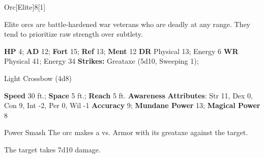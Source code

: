   \begin{monsection}{Orc}[Elite]{8}[1]
    \vspace{-1em}\vspace{-1em}
    \vspace{0em}

    
      Elite orcs are battle-hardened war veterans who are deadly at any range.
      They tend to prioritize raw strength over subtlety.
    

    \begin{spellcontent}
      \begin{spelltargetinginfo}
        \pari \textbf{HP} 4;
          \textbf{AD} 12;
          \textbf{Fort} 15;
          \textbf{Ref} 13;
          \textbf{Ment} 12
        \pari \textbf{DR} Physical 13; Energy 6
        \pari \textbf{WR} Physical 41; Energy 34
        \pari \textbf{Strikes:}
            Greataxe  (5d10, Sweeping 1);
\par Light Crossbow  (4d8)
      \end{spelltargetinginfo}
    \end{spellcontent}
    \begin{monsterfooter}
      \pari \textbf{Speed} 30 ft.;
        \textbf{Space} 5 ft.;
        \textbf{Reach} 5 ft.
      \pari \textbf{Awareness} 
      \pari \textbf{Attributes}:
        Str 11, Dex 0,
        Con 9, Int -2,
        Per 0, Wil -1
      \pari \textbf{Accuracy} 9;
        \textbf{Mundane Power} 13;
      \textbf{Magical Power} 8
    \end{monsterfooter}
  \end{monsection}
  \begin{freeability}{Power Smash}
       The orc makes a 
         vs. Armor
        with its greataxe against the target.
    
    \hit The target takes 7d10  damage.
    \end{freeability}
  
